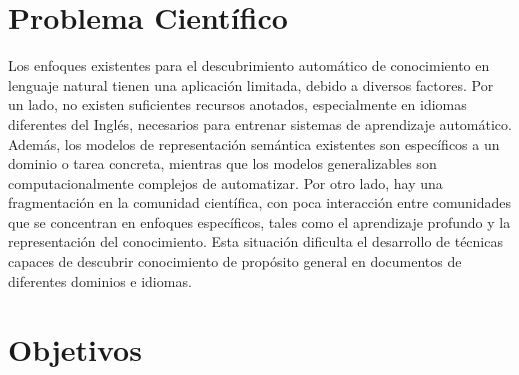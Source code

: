 \section{Problema Científico}
\label{chap1:problem}

Los enfoques existentes para el descubrimiento automático de conocimiento en lenguaje natural tienen una aplicación limitada, debido a diversos factores.
Por un lado, no existen suficientes recursos anotados, especialmente en idiomas diferentes del Inglés, necesarios para entrenar sistemas de aprendizaje automático.
Además, los modelos de representación semántica existentes son específicos a un dominio o tarea concreta, mientras que los modelos generalizables son computacionalmente complejos de automatizar.
Por otro lado, hay una fragmentación en la comunidad científica, con poca interacción entre comunidades que se concentran en enfoques específicos, tales como el aprendizaje profundo y la representación del conocimiento.
Esta situación dificulta el desarrollo de técnicas capaces de descubrir conocimiento de propósito general en documentos de diferentes dominios e idiomas.

\section{Objetivos}
\label{chap1:objectives}

